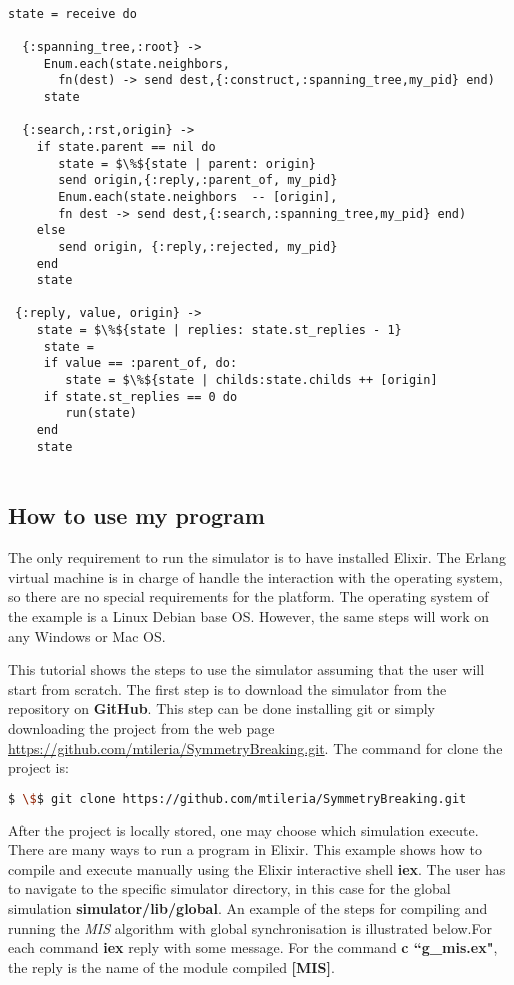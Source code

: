 \begin{lstlisting}[frame=single, columns=fullflexible, mathescape=true, caption= Spanning Tree construction in Beta, label = code:spanningtree]

state = receive do

  {:spanning_tree,:root} ->
     Enum.each(state.neighbors,
       fn(dest) -> send dest,{:construct,:spanning_tree,my_pid} end)
 	 state

  {:search,:rst,origin} ->
 	if state.parent == nil do
 	   state = $\%${state | parent: origin}
 	   send origin,{:reply,:parent_of, my_pid}
       Enum.each(state.neighbors  -- [origin],
       fn dest -> send dest,{:search,:spanning_tree,my_pid} end)
 	else
 	   send origin, {:reply,:rejected, my_pid}
 	end
    state

 {:reply, value, origin} ->
    state = $\%${state | replies: state.st_replies - 1}
     state =
     if value == :parent_of, do:  
        state = $\%${state | childs:state.childs ++ [origin]
     if state.st_replies == 0 do
 	    run(state)
    end
 	state
    

\end{lstlisting}



\subsection{How to use my program}

The only requirement to run the simulator is to have installed Elixir. The Erlang virtual machine is in charge of handle the interaction with the operating system, so there are no special requirements for the platform. The operating system of the example is a Linux Debian base OS. However, the same steps will work on any Windows or Mac OS.         

This tutorial shows the steps to use the simulator assuming that the user will start from scratch. The first step is to download the simulator from the repository on \textbf{GitHub}. This step can be done installing git or simply downloading the project from the web page \url{https://github.com/mtileria/SymmetryBreaking.git}. The command for clone the project is:

\begin{lstlisting}[language=bash, columns=fullflexible,mathescape=true]
   $ \$$ git clone https://github.com/mtileria/SymmetryBreaking.git
\end{lstlisting}

After the project is locally stored, one may choose which simulation execute. There are many ways to run a program in Elixir. This example shows how to compile and execute manually using the Elixir interactive shell \textbf{iex}. The user has to navigate to the specific simulator directory, in this case for the global simulation \textbf{simulator/lib/global}. An example of the steps for compiling and running the \textit{MIS} algorithm with global synchronisation is illustrated below.For each command \textbf{iex} reply with some message. For the command \textbf{c ``g\_mis.ex"}, the reply is the name of the module compiled \textbf{[MIS]}.



